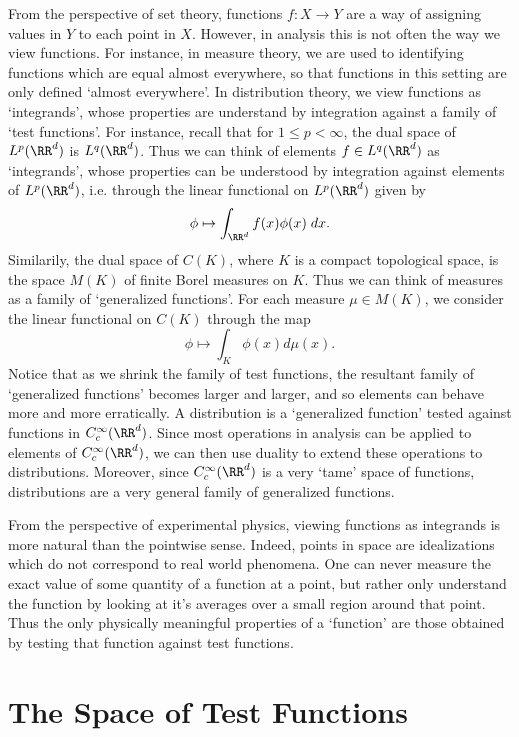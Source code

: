 From the perspective of set theory, functions $f: X \to Y$ are a way of assigning values in $Y$ to each point in $X$. However, in analysis this is not often the way we view functions. For instance, in measure theory, we are used to identifying functions which are equal almost everywhere, so that functions in this setting are only defined `almost everywhere'. In distribution theory, we view functions as `integrands', whose properties are understand by integration against a family of `test functions'. For instance, recall that for $1 \leq p < \infty$, the dual space of $L^p(\RR^d)$ is $L^q(\RR^d)$. Thus we can think of elements $f \in L^q(\RR^d)$ as `integrands', whose properties can be understood by integration against elements of $L^p(\RR^d)$, i.e. through the linear functional on $L^p(\RR^d)$ given by
%
\[ \phi \mapsto \int_{\RR^d} f(x) \phi(x)\; dx. \]
%
Similarily, the dual space of $C(K)$, where $K$ is a compact topological space, is the space $M(K)$ of finite Borel measures on $K$. Thus we can think of measures as a family of `generalized functions'. For each measure $\mu \in M(K)$, we consider the linear functional on $C(K)$ through the map
%
\[ \phi \mapsto \int_K \phi(x) d\mu(x). \]
%
Notice that as we shrink the family of test functions, the resultant family of `generalized functions' becomes larger and larger, and so elements can behave more and more erratically. A distribution is a `generalized function' tested against functions in $C_c^\infty(\RR^d)$. Since most operations in analysis can be applied to elements of $C_c^\infty(\RR^d)$, we can then use duality to extend these operations to distributions. Moreover, since $C_c^\infty(\RR^d)$ is a very `tame' space of functions, distributions are a very general family of generalized functions.

\begin{remark}
  From the perspective of experimental physics, viewing functions as integrands is more natural than the pointwise sense. Indeed, points in space are idealizations which do not correspond to real world phenomena. One can never measure the exact value of some quantity of a function at a point, but rather only understand the function by looking at it's averages over a small region around that point. Thus the only physically meaningful properties of a `function' are those obtained by testing that function against test functions.
\end{remark}

\section{The Space of Test Functions}

